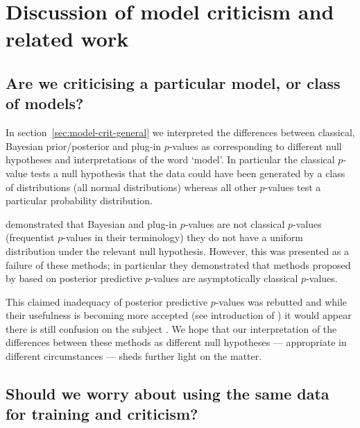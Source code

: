 

\section{Discussion of model criticism and related work}

\subsection{Are we criticising a particular model, or class of models?}

In section~\ref{sec:model-crit-general} we interpreted the differences between classical, Bayesian prior/posterior and plug-in $p$-values as corresponding to different null hypotheses and interpretations of the word `model'.
In particular the classical $p$-value tests a null hypothesis that the data could have been generated by a class of distributions (\eg all normal distributions) whereas all other $p$-values test a particular probability distribution.

\citet{Robins2000-oz} demonstrated that Bayesian and plug-in $p$-values are not classical $p$-values (frequentist $p$-values in their terminology) \ie they do not have a uniform distribution under the relevant null hypothesis.
However, this was presented as a failure of these methods; in particular they demonstrated that methods proposed by \citet{Bayarri1999-ty} based on posterior predictive $p$-values are asymptotically classical $p$-values.

This claimed inadequacy of posterior predictive $p$-values was rebutted \citep{Gelman2003-xx} and while their usefulness is becoming more accepted (see \eg introduction of \cite{Bayarri2007-cp}) it would appear there is still confusion on the subject \citep{Gelman2013-am}.
We hope that our interpretation of the differences between these methods as different null hypotheses --- appropriate in different circumstances --- sheds further light on the matter.

\subsection{Should we worry about using the same data for training and criticism?}

